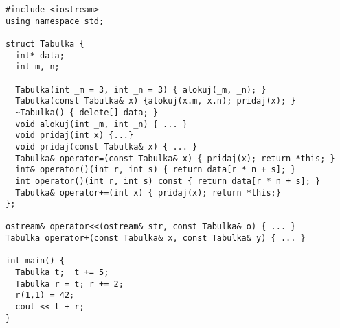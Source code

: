 \begin{lstlisting}
#include <iostream>
using namespace std;

struct Tabulka {
  int* data;
  int m, n;

  Tabulka(int _m = 3, int _n = 3) { alokuj(_m, _n); }
  Tabulka(const Tabulka& x) {alokuj(x.m, x.n); pridaj(x); }
  ~Tabulka() { delete[] data; }
  void alokuj(int _m, int _n) { ... }
  void pridaj(int x) {...}
  void pridaj(const Tabulka& x) { ... }
  Tabulka& operator=(const Tabulka& x) { pridaj(x); return *this; }
  int& operator()(int r, int s) { return data[r * n + s]; }  
  int operator()(int r, int s) const { return data[r * n + s]; }
  Tabulka& operator+=(int x) { pridaj(x); return *this;}
};

ostream& operator<<(ostream& str, const Tabulka& o) { ... }
Tabulka operator+(const Tabulka& x, const Tabulka& y) { ... }

int main() {
  Tabulka t;  t += 5;
  Tabulka r = t; r += 2;
  r(1,1) = 42;
  cout << t + r;
}
\end{lstlisting}

